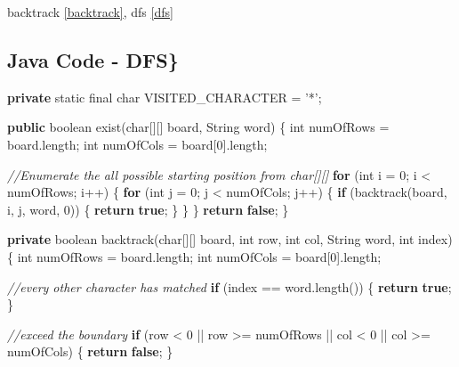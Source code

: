 \documentclass[]{book}
\newenvironment{Shaded}{\begin{snugshade}}{\end{snugshade}}
\newcommand{\BuiltInTok}[1]{#1}
\newcommand{\CharTok}[1]{\textcolor[rgb]{0.31,0.60,0.02}{#1}}
\newcommand{\CommentTok}[1]{\textcolor[rgb]{0.56,0.35,0.01}{\textit{#1}}}
\newcommand{\DataTypeTok}[1]{\textcolor[rgb]{0.13,0.29,0.53}{#1}}
\newcommand{\DecValTok}[1]{\textcolor[rgb]{0.00,0.00,0.81}{#1}}
\newcommand{\FunctionTok}[1]{\textcolor[rgb]{0.00,0.00,0.00}{#1}}
\newcommand{\KeywordTok}[1]{\textcolor[rgb]{0.13,0.29,0.53}{\textbf{#1}}}
\newcommand{\NormalTok}[1]{#1}
\begin{document}
backtrack \ref{backtrack}, dfs \ref{dfs}

\hypertarget{java-code---dfs}{%
\subsection{Java Code - DFS\}}\label{java-code---dfs}}

\begin{Shaded}
\begin{Highlighting}[]
\KeywordTok{private} \DataTypeTok{static} \DataTypeTok{final} \DataTypeTok{char}\NormalTok{ VISITED_CHARACTER = }\CharTok{'*'}\NormalTok{;}

\KeywordTok{public} \DataTypeTok{boolean} \FunctionTok{exist}\NormalTok{(}\DataTypeTok{char}\NormalTok{[][] board, }\BuiltInTok{String}\NormalTok{ word) \{}
    \DataTypeTok{int}\NormalTok{ numOfRows = board.}\FunctionTok{length}\NormalTok{;}
    \DataTypeTok{int}\NormalTok{ numOfCols = board[}\DecValTok{0}\NormalTok{].}\FunctionTok{length}\NormalTok{;}

    \CommentTok{//Enumerate the all possible starting position from char[][]}
    \KeywordTok{for}\NormalTok{ (}\DataTypeTok{int}\NormalTok{ i = }\DecValTok{0}\NormalTok{; i < numOfRows; i++) \{}
        \KeywordTok{for}\NormalTok{ (}\DataTypeTok{int}\NormalTok{ j = }\DecValTok{0}\NormalTok{; j < numOfCols; j++) \{}
            \KeywordTok{if}\NormalTok{ (}\FunctionTok{backtrack}\NormalTok{(board, i, j, word, }\DecValTok{0}\NormalTok{)) \{}
                \KeywordTok{return} \KeywordTok{true}\NormalTok{;}
\NormalTok{            \}}
\NormalTok{        \}}
\NormalTok{    \}}
    \KeywordTok{return} \KeywordTok{false}\NormalTok{;}
\NormalTok{\}}

\KeywordTok{private} \DataTypeTok{boolean} \FunctionTok{backtrack}\NormalTok{(}\DataTypeTok{char}\NormalTok{[][] board, }\DataTypeTok{int}\NormalTok{ row, }\DataTypeTok{int}\NormalTok{ col, }\BuiltInTok{String}\NormalTok{ word, }\DataTypeTok{int}\NormalTok{ index) \{}
    \DataTypeTok{int}\NormalTok{ numOfRows = board.}\FunctionTok{length}\NormalTok{;}
    \DataTypeTok{int}\NormalTok{ numOfCols = board[}\DecValTok{0}\NormalTok{].}\FunctionTok{length}\NormalTok{;}

    \CommentTok{//every other character has matched}
    \KeywordTok{if}\NormalTok{ (index == word.}\FunctionTok{length}\NormalTok{()) \{}
        \KeywordTok{return} \KeywordTok{true}\NormalTok{;}
\NormalTok{    \}}

    \CommentTok{//exceed the boundary}
    \KeywordTok{if}\NormalTok{ (row < }\DecValTok{0}\NormalTok{ || row >= numOfRows || col < }\DecValTok{0}\NormalTok{ || col >= numOfCols) \{}
        \KeywordTok{return} \KeywordTok{false}\NormalTok{;}
\NormalTok{    \}}


\end{Highlighting}
\end{Shaded}
\end{document}
